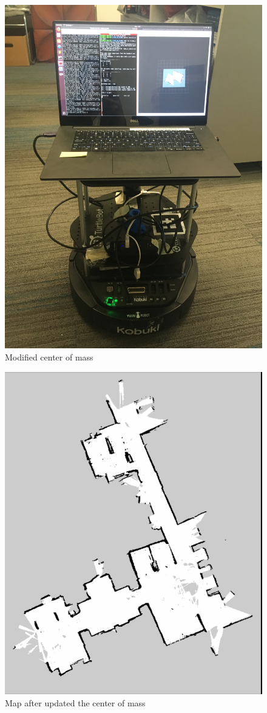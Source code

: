 \documentclass[letterpaper, 10 pt, conference]{ieeeconf}  %
\begin{document}
\begin{figure}[!pht]
  \centerline{\includegraphics[width=0.6\linewidth]{kobuki_modified.JPG}}
  \caption{Modified center of mass} 
  \label{fig:robot1}
\end{figure}

\begin{figure}[!pht]
  \centerline{\includegraphics[width=0.8\linewidth]{betterMap.png}}
  \caption{Map after updated the center of mass} 
  \label{fig:newofficeMap}
\end{figure}
\end{document}
